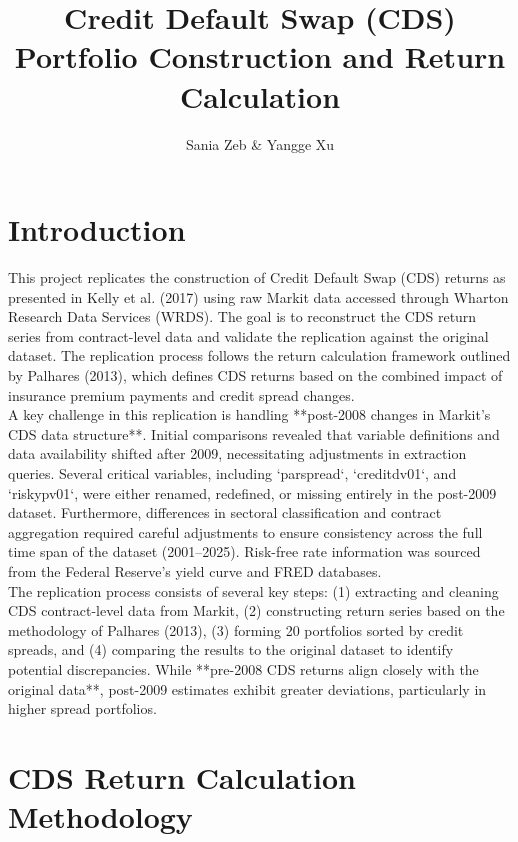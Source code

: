 \documentclass{article}
\title{Credit Default Swap (CDS) Portfolio Construction and Return Calculation}
\author{Sania Zeb \& Yangge Xu}
\begin{document}
\maketitle

\section{Introduction}

This project replicates the construction of Credit Default Swap (CDS) returns as presented in Kelly et al. (2017) using raw Markit data accessed through Wharton Research Data Services (WRDS). The goal is to reconstruct the CDS return series from contract-level data and validate the replication against the original dataset. The replication process follows the return calculation framework outlined by Palhares (2013), which defines CDS returns based on the combined impact of insurance premium payments and credit spread changes. \\

A key challenge in this replication is handling **post-2008 changes in Markit's CDS data structure**. Initial comparisons revealed that variable definitions and data availability shifted after 2009, necessitating adjustments in extraction queries. Several critical variables, including `parspread`, `creditdv01`, and `riskypv01`, were either renamed, redefined, or missing entirely in the post-2009 dataset. Furthermore, differences in sectoral classification and contract aggregation required careful adjustments to ensure consistency across the full time span of the dataset (2001–2025). Risk-free rate information was sourced from the Federal Reserve's yield curve and FRED databases. \\

The replication process consists of several key steps: (1) extracting and cleaning CDS contract-level data from Markit, (2) constructing return series based on the methodology of Palhares (2013), (3) forming 20 portfolios sorted by credit spreads, and (4) comparing the results to the original dataset to identify potential discrepancies. While **pre-2008 CDS returns align closely with the original data**, post-2009 estimates exhibit greater deviations, particularly in higher spread portfolios.

\section{CDS Return Calculation Methodology}
\end{document}
